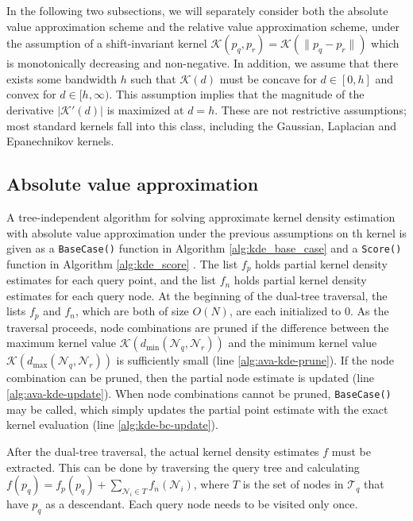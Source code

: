 In the following two subsections, we will separately consider both the absolute
value approximation scheme and the relative value approximation scheme, under
the assumption of a shift-invariant kernel $\mathcal{K}(p_q, p_r) =
\mathcal{K}(\| p_q - p_r \|)$ which is monotonically decreasing and
non-negative.  In addition, we assume that there exists some bandwidth $h$ such
that $\mathcal{K}(d)$ must be concave for $d \in [0, h]$ and convex for $d \in
[h, \infty)$.  This assumption implies that the magnitude of the derivative
$|\mathcal{K}'(d)|$ is maximized at $d = h$.  These are not restrictive
assumptions; most standard kernels fall into this class, including the Gaussian,
Laplacian and Epanechnikov kernels.

\subsection{Absolute value approximation}

A tree-independent algorithm for solving approximate kernel density estimation
with absolute value approximation under the previous assumptions on th kernel
is given as a \texttt{BaseCase()} function in Algorithm \ref{alg:kde_base_case}
and a \texttt{Score()} function in Algorithm \ref{alg:kde_score}  \citep[a
correctness proof can be found in][]{curtin2013tree}.  The list $f_p$ holds
partial kernel density estimates for each query point, and the list $f_n$ holds
partial kernel density estimates for each query node.  At the beginning of the
dual-tree traversal, the lists $f_p$ and $f_n$, which are both of size $O(N)$,
are each initialized to 0.  As the traversal proceeds, node combinations are
pruned if the difference between the maximum kernel value
$\mathcal{K}(d_{\min}(\mathscr{N}_q, \mathscr{N}_r))$ and the minimum kernel
value $\mathcal{K}(d_{\max}(\mathscr{N}_q, \mathscr{N}_r))$ is sufficiently
small (line \ref{alg:ava-kde-prune}).  If the node combination can be pruned,
then the partial node estimate is updated (line \ref{alg:ava-kde-update}).  When
node combinations cannot be pruned, \texttt{BaseCase()} may be called, which
simply updates the partial point estimate with the exact kernel evaluation (line
\ref{alg:kde-bc-update}).

After the dual-tree traversal, the actual kernel density estimates $f$
must be extracted.  This can be done by traversing the query tree and
calculating $f(p_q) = f_p(p_q) + \sum_{\mathscr{N}_i \in T}
f_n(\mathscr{N}_i)$, where $T$ is the set of nodes in $\mathscr{T}_q$ that
have $p_q$ as a descendant.  %
Each query node needs to be visited only once.

